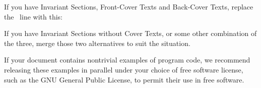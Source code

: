 If you have Invariant Sections, Front-Cover Texts and Back-Cover Texts,
replace the \ line with this:

\bigskip
{}
\bigskip

If you have Invariant Sections without Cover Texts, or some other
combination of the three, merge those two alternatives to suit the
situation.

If your document contains nontrivial examples of program code, we
recommend releasing these examples in parallel under your choice of
free software license, such as the GNU General Public License,
to permit their use in free software.
